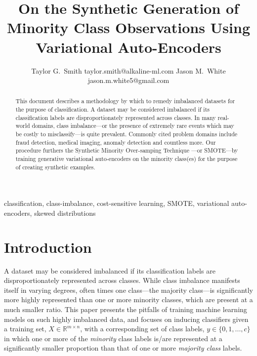 \documentclass[twoside,11pt]{article}
\begin{document}
\title{On the Synthetic Generation of Minority Class Observations Using Variational Auto-Encoders}

\author{\name Taylor G.\ Smith \email taylor.smith@alkaline-ml.com
       \AND
       \name Jason M.\ White \email jason.m.white5@gmail.com}

\maketitle

\begin{abstract}%
This document describes a methodology by which to remedy imbalanced datasets for the purpose of classification. A dataset may be considered imbalanced if its classification labels are disproportionately represented across classes. In many real-world domains, class imbalance---or the presence of extremely rare events which may be costly to misclassify---is quite prevalent. Commonly cited problem domains include fraud detection, medical imaging, anomaly detection and countless more.  Our procedure furthers the Synthetic Minority Over-samping Technique \citep*{chawla2002smote}---or SMOTE---by training generative variational auto-encoders on the minority class(es) for the purpose of creating synthetic examples.
\end{abstract}

\begin{keywords}
  classification, class-imbalance, cost-sensitive learning, SMOTE, variational auto-encoders, skewed distributions
\end{keywords}

\section{Introduction}

A dataset may be considered imbalanced if its classification labels are disproportionately represented across classes. While class imbalance manifests itself in varying degrees, often times one class---the majority class---is significantly more highly represented than one or more minority classes, which are present at a much smaller ratio. This paper presents the pitfalls of training machine learning models on such highly imbalanced data, and focuses on inducing classifiers given a training set, $X \in \mathbb{R}^{m \times n}$, with a corresponding set of class labels, $y \in \{0, 1, ..., c\}$ in which one or more of the \emph{minority} class labels is/are represented at a significantly smaller proportion than that of one or more \emph{majority class} labels.
\end{document}
